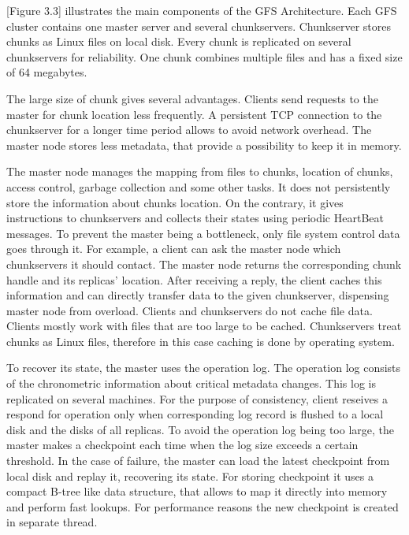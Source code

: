 [Figure 3.3] illustrates the main components of the GFS Architecture.
Each GFS cluster contains one master server and several chunkservers.
Chunkserver stores chunks as Linux files on local disk.
Every chunk is replicated on several chunkservers for reliability.
One chunk combines multiple files and has a fixed size of 64 megabytes.

The large size of chunk gives several advantages.
Clients send requests to the master for chunk location less frequently.
A persistent TCP connection to the chunkserver for a longer time period allows to avoid network overhead.
The master node stores less metadata, that provide a possibility to keep it in memory.

The master node manages the mapping from files to chunks, location of chunks, access control, garbage collection and some other tasks.
It does not persistently store the information about chunks location. 
On the contrary, it gives instructions to chunkservers and collects their states using periodic HeartBeat messages.
To prevent the master being a bottleneck, only file system control data goes through it.
For example, a client can ask the master node which chunkservers it should contact.
The master node returns the corresponding chunk handle and its replicas' location.
After receiving a reply, the client caches this information and can directly transfer data to the given chunkserver, dispensing master node from overload.
Clients and chunkservers do not cache file data.
Clients mostly work with files that are too large to be cached.
Chunkservers treat chunks as Linux files, therefore in this case caching is done by operating system.

To recover its state, the master uses the operation log.
The operation log consists of the chronometric information about critical metadata changes.
This log is replicated on several machines.
For the purpose of consistency, client reseives a respond for operation only when corresponding log record is flushed to a local disk and the disks of all replicas.
To avoid the operation log being too large, the master makes a checkpoint each time when the log size exceeds a certain threshold.
In the case of failure, the master can load the latest checkpoint from local disk and replay it, recovering its state.
For storing checkpoint it uses a compact B-tree like data structure, that allows to map it directly into memory and perform fast lookups.
For performance reasons the new checkpoint is created in separate thread.

